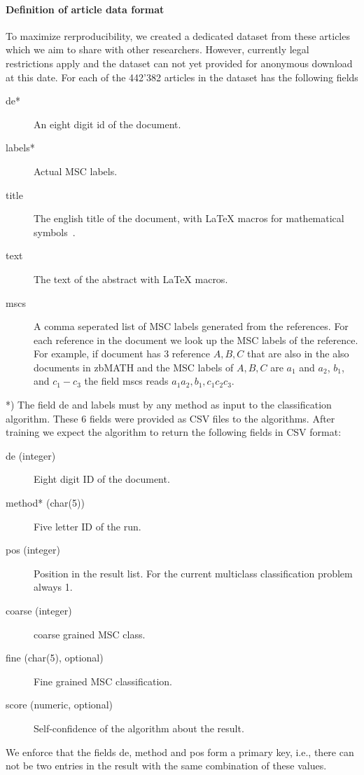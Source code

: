 \paragraph{Definition of article data format}
To maximize rerproducibility, we created a dedicated dataset from these articles which we aim to share with other researchers.
However, currently legal restrictions apply and the dataset can not yet provided for anonymous download at this date.
For each of the 442'382 articles in the dataset has the following fields
\begin{description}
  \item[de*] An eight digit id of the document.
  \item[labels*] Actual MSC labels.
  \item[title] The english title of the document, with LaTeX macros for mathematical symbols~\cite{Schubotz2019b}.
  \item[text] The text of the abstract with LaTeX macros.
  \item[mscs] A comma seperated list of MSC labels generated from the references. For each reference in the document we look up the MSC labels of the reference. For example, if document has 3 reference $A,B,C$ that are also in the also documents in zbMATH and the MSC labels of $A,B,C$ are $a_1$ and $a_2$, $b_1$, and $c_1-c_3$ the field mscs reads $a_1  a_2, b_1, c_1 c_2 c_3.$
\end{description}
*) The field de and labels must by any method as input to the classification algorithm.
These 6 fields were provided as CSV files to the algorithms.
After training we expect the algorithm to return the following fields in CSV format:
\begin{description}
  \item[de (integer)] Eight digit ID of the document.
  \item[method* (char(5))] Five letter ID of the run.
  \item[pos (integer)] Position in the result list. For the current multiclass classification problem always 1.
  \item[coarse (integer)] coarse grained MSC class.
  \item[fine (char(5), optional)] Fine grained MSC classification.
  \item[score (numeric, optional)] Self-confidence of the algorithm about the result. 
\end{description}
We enforce that the fields de, method and pos form a primary key, i.e., there can not be two entries in the result with the same combination of these values.
